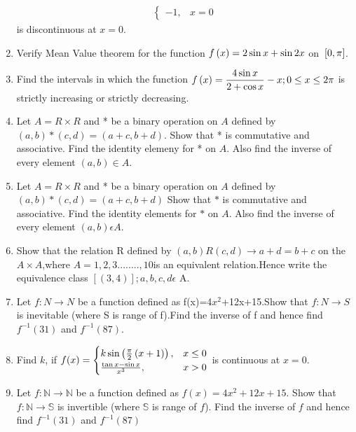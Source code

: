 \begin{enumerate}
\begin{align*}
\begin{cases}
			                    -1 ,                                              & x = 0
		                    \end{cases}
	      \end{align*}
	      is discontinuous at $x=0$.
	\item Verify Mean Value theorem for the function $f\left(x\right) = 2\sin{x} + \sin{2x}$ on ${}\left[0,\pi\right]$.
	\item Find the intervals in which the function $f\left(x\right) = \dfrac{4\sin x}{2 + \cos x} - x; 0 \leq x \leq 2\pi$ is strictly increasing or strictly decreasing.
	\item Let $A=R\times R$ and * be a binary operation on $A$ defined by $(a,b)*(c,d) = (a+c,b+d)$.
	      Show that * is commutative and associative. Find the identity elemeny for * on $A$. Also find the inverse of every element $(a, b) \in A$.
	\item Let $A=R\times R$ and * be a binary operation on $A$ defined by\\ $ (a,b)*(c,d)=(a+c, b+d)$
	      Show that $*$ is commutative and associative. Find the identity elements for $*$ on $A$. Also find the inverse of every element $(a,b)\epsilon A$.
	\item Show that the relation R defined by $(a,b) R(c,d) \rightarrow a+d=b+c$ on the  $A\times A$,where $A={1,2,3........,10} $is an equivalent relation.Hence write the equivalence class $[(3,4)]; a,b,c,d \epsilon$ A.
	\item Let $f:N\rightarrow{N}$ be a function defined as f(x)=4$x^{2}$+12x+15.Show that $f:N\rightarrow{S}$ is inevitable (where S is range of f).Find the inverse of f and hence find $f^{-1}(31)$ and $f^{-1}(87)$.
	\item Find $k$, if $f(x) = 
    \begin{cases} 
        k \sin \left(\frac{\pi}{2}\left(x+1\right)\right),& x \leq 0 \\ 
        \frac{\tan x - \sin x}{x^{3}},& x > 0 
    \end{cases}$ is continuous at $x = 0$.
	\item Let $f : \mathbb{N} \xrightarrow{} \mathbb{N}$ be a function defined as $f(x) = 4x^{2} + 12x + 15$. Show that $f : \mathbb{N} \xrightarrow{} \mathbb{S}$ is invertible (where $\mathbb{S}$ is range of $f$). Find the inverse of $f$ and hence find $f^{-1}(31)$ and $f^{-1}(87)$
\end{enumerate}
